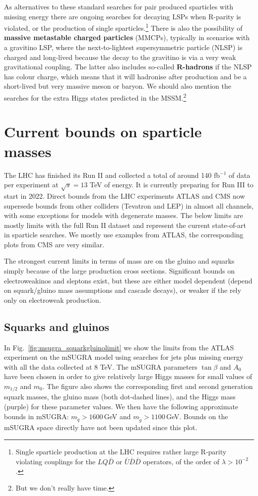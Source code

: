 \documentclass[notes.tex]{subfiles}
\begin{document}
As alternatives to these standard searches for pair produced sparticles with missing energy there are ongoing searches for decaying LSPs when R-parity is violated, or the production of single sparticles.\footnote{Single sparticle production at the LHC requires rather large R-parity violating couplings for the $LQ\bar D$ or $\bar U \bar D\bar D$ operators, of the order of $\lambda > 10^{-2}$.} There is also the possibility of {\bf massive metastable charged particles} (MMCPs), typically in scenarios with a gravitino LSP, where the next-to-lightest supersymmetric particle (NLSP) is charged and long-lived because the decay to the gravitino is via a very weak gravitational coupling. The latter also includes so-called {\bf R-hadrons} if the NLSP has colour charge, which means that it will hadronise after production and be a short-lived but very massive meson or baryon. We should also mention the searches for the extra Higgs states predicted in the MSSM.\footnote{But we don't really have time.}


\section{Current bounds on sparticle masses}
\label{sec:current_LHC_bounds}
The LHC has finished its Run II and collected a total of around 140 fb$^{-1}$ of data per experiment at $\sqrt{s}=13$ TeV of energy. It is currently preparing for Run III to start in 2022.  Direct bounds from the LHC experiments ATLAS and CMS now supersede bounds from other colliders (Tevatron and LEP) in almost all channels, with some exceptions for models with degenerate masses. The below limits are mostly limits with the full Run II dataset and represent the current state-of-art in sparticle searches. We mostly use examples from ATLAS, the corresponding plots from CMS are very similar.

The strongest current limits in terms of mass are on the gluino and squarks simply because of the large production cross sections. Significant bounds on electroweakinos and sleptons exist, but these are either model dependent (depend on squark/gluino mass assumptions and cascade decays), or weaker if the rely only on electroweak production.

\subsection{Squarks and gluinos}
In Fig.~\ref{fig:msugra_squarkgluinolimit} we show the limits from the ATLAS experiment on the mSUGRA model using searches for jets plus missing energy with all the data collected at 8 TeV. The mSUGRA parameters $\tan\beta$ and $A_0$ have been chosen in order to give relatively large Higgs masses for small values of $m_{1/2}$ and $m_0$. The figure also shows the corresponding first and second generation squark masses, the gluino mass (both dot-dashed lines), and the Higgs mass (purple) for these parameter values. We then have the following approximate bounds in mSUGRA: $m_{\tilde{q}}>1600$\,GeV and $m_{\tilde{g}}> 1100$\,GeV. Bounds on the mSUGRA space directly have not been updated since this plot.
\end{document}
